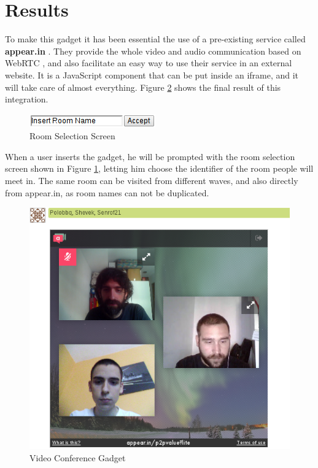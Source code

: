 \section{Results}
To make this gadget it has been essential the use of a pre-existing service called \textbf{appear.in} \cite{ref:appearin}. They provide the whole video and audio communication based on WebRTC \cite{ref:webrtc}, and also facilitate an easy way to use their service in an external website. It is a JavaScript component that can be put inside an iframe, and it will take care of almost everything. Figure \ref{fig:video_gadget} shows the final result of this integration.
\begin{figure}[H]
  \center
    \includegraphics[keepaspectratio, scale=0.8]{Media/Captures/Extensions/VideoGadget/RoomSelection.png}
  \caption{Room Selection Screen}
  \label{fig:video_gadget_room}
\end{figure}
When a user inserts the gadget, he will be prompted with the room selection screen shown in Figure \ref{fig:video_gadget_room}, letting him choose the identifier of the room people will meet in. The same room can be visited from different waves, and also directly from appear.in, as room names can not be duplicated.
\begin{figure}[H]
  \center
    \includegraphics[keepaspectratio, scale=0.45]{Media/Captures/Extensions/VideoGadget.png}
  \caption{Video Conference Gadget}
  \label{fig:video_gadget}
\end{figure}
